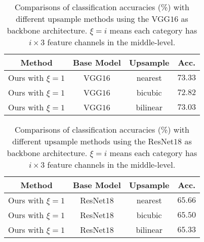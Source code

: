 \documentclass[journal]{IEEEtran}
\begin{document}
\begin{table}[!t]
  \centering
  \small
  \caption{Comparisons of classification accuracies (\%) with different upsample methods using the VGG$16$ as backbone architecture. $\xi =i$ means each category has $i \times 3$ feature channels in the middle-level.}
  \begin{adjustbox}{width=0.8\linewidth,center}
   \Huge   %
    \begin{tabular}{|c|c|c|c|}
    \toprule
    Method & Base Model & Upsample & Acc. \\
    \midrule
    \midrule
    Ours with $\xi =1$ & VGG$16$ & nearest & $73.33 $\\
    Ours with $\xi =1$ & VGG$16$ & bicubic & $72.82 $\\
    Ours with $\xi =1$ & VGG$16$ & bilinear &$ 73.03$ \\
    \bottomrule
    \end{tabular}%
  \end{adjustbox}
  \label{tab:ablation_4}%
\end{table}%


\begin{table}[!t]
  \centering
  \small
  \caption{Comparisons of classification accuracies (\%) with different upsample methods using the ResNet$18$ as backbone architecture. $\xi =i$ means each category has $i \times 3$ feature channels in the middle-level.}
  \begin{adjustbox}{width=0.8\linewidth,center}
   \Huge   %
    \begin{tabular}{|c|c|c|c|}
    \toprule
    Method & Base Model & Upsample & Acc. \\
    \midrule
    \midrule
    Ours with $\xi =1$ & ResNet$18$ & nearest  & $65.66$ \\
    Ours with $\xi =1$ & ResNet$18$ & bicubic  & $65.50$ \\
    Ours with $\xi =1$ & ResNet$18$ & bilinear & $65.33$ \\
    \bottomrule
    \end{tabular}%
  \end{adjustbox}
  \label{tab:ablation_5}%
\end{table}%
\end{document}
